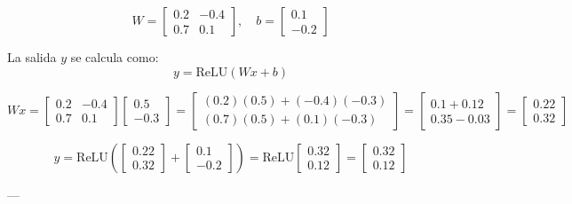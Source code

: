 \documentclass[11pt]{article} %
\begin{document}
\[
W = \begin{bmatrix}
0.2 & -0.4 \\
0.7 & 0.1 
\end{bmatrix}, \quad
b = \begin{bmatrix}
0.1 \\
-0.2
\end{bmatrix}
\]

La salida \(y\) se calcula como:
\[
y = \text{ReLU}(Wx + b)
\]

\[
Wx = \begin{bmatrix}
0.2 & -0.4 \\
0.7 & 0.1 
\end{bmatrix}
\begin{bmatrix}
0.5 \\
-0.3
\end{bmatrix}
= \begin{bmatrix}
(0.2)(0.5) + (-0.4)(-0.3) \\
(0.7)(0.5) + (0.1)(-0.3)
\end{bmatrix}
= \begin{bmatrix}
0.1 + 0.12 \\
0.35 - 0.03
\end{bmatrix}
= \begin{bmatrix}
0.22 \\
0.32
\end{bmatrix}
\]

\[
y = \text{ReLU}\left(
\begin{bmatrix}
0.22 \\
0.32
\end{bmatrix} + 
\begin{bmatrix}
0.1 \\
-0.2
\end{bmatrix}
\right)
= \text{ReLU}
\begin{bmatrix}
0.32 \\
0.12
\end{bmatrix}
= \begin{bmatrix}
0.32 \\
0.12
\end{bmatrix}
\]

---
\end{document}
